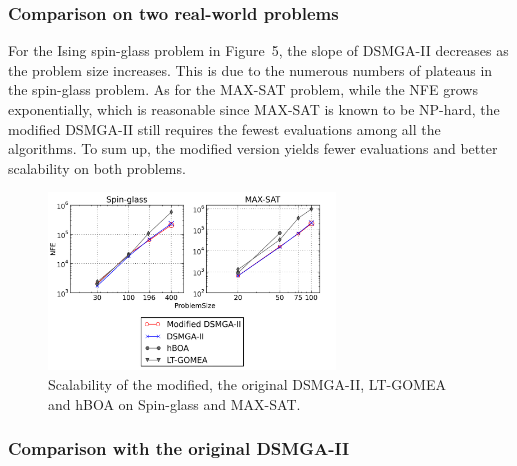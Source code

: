 \subsubsection{ Comparison on two real-world problems }

For the Ising spin-glass problem in Figure~5, the slope of DSMGA-II decreases as the problem size increases. 
This is due to the numerous numbers of plateaus in the spin-glass problem.
As for the MAX-SAT problem, while the NFE grows exponentially, which is reasonable since MAX-SAT is known to be NP-hard, the modified DSMGA-II still requires the fewest evaluations among all the algorithms. To sum up, the modified version yields fewer evaluations and better scalability on both problems. 

\begin{figure}
\centering
\includegraphics[width=3in]{spin_satResults}
\caption{Scalability of the modified, the original DSMGA-II, LT-GOMEA and hBOA on Spin-glass and MAX-SAT.}
\end{figure}

\subsubsection{ Comparison with the original DSMGA-II }

